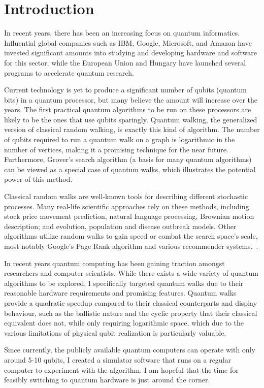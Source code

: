 \chapter{Introduction}

In recent years, there has been an increasing focus on quantum informatics. Influential global companies such as IBM, Google, Microsoft, and Amazon have invested significant amounts into studying and developing hardware and software for this sector, while the European Union and Hungary have launched several programs to accelerate quantum research.

Current technology is yet to produce a significant number of qubits (quantum bits) in a quantum processor, but many believe the amount will increase over the years. The first practical quantum algorithms to be run on these processors are likely to be the ones that use qubits sparingly. Quantum walking, the generalized version of classical random walking, is exactly this kind of algorithm. The number of qubits required to run a quantum walk on a graph is logarithmic in the number of vertices, making it a promising technique for the near future. Furthermore, Grover's search algorithm (a basis for many quantum algorithms) can be viewed as a special case of quantum walks, which illustrates the potential power of this method.

Classical random walks are well-known tools for describing different stochastic processes. Many real-life scientific approaches rely on these methods, including stock price movement prediction, natural language processing, Brownian motion description; and evolution, population and disease outbreak models. Other algorithms utilize random walks to gain speed or combat the search space's scale, most notably Google's Page Rank algorithm and various recommender systems.~\cite{XiaReview}.

In recent years quantum computing has been gaining traction amongst researchers and computer scientists. While there exists a wide variety of quantum algorithms to be explored, I specifically targeted quantum walks due to their reasonable hardware requirements and promising features. Quantum walks provide a quadratic speedup compared to their classical counterparts and display behaviour, such as the ballistic nature and the cyclic property that their classical equivalent does not, while only requiring logarithmic space, which due to the various limitations of physical qubit realization is particularly valuable.~\cite{Portugal}

Since currently, the publicly available quantum computers can operate with only around 5-10 qubits, I created a simulator software that runs on a regular computer to experiment with the algorithm. I am hopeful that the time for feasibly switching to quantum hardware is just around the corner.

